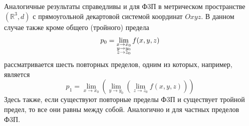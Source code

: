 Аналогичные результаты справедливы и для Ф3П в метрическом пространстве $ (\mathbb{R}^3, d) $ с прямоугольной декартовой системой координат $ Oxyz $. В данном случае также кроме общего (тройного) предела
\begin{equation*}
    p_0 = \lim\limits_{ \substack{ x \to x_0 \\ y \to y_0 \\ z \to z_0 } } f(x, y, z)
\end{equation*}
рассматривается шесть повторных пределов, одним из которых, например, является
\begin{equation*}
    p_1 = \lim\limits_{x \to x_0} \left( \lim\limits_{y \to y_0}
    \left( \lim\limits_{z \to z_0} f(x, y, z) \right) \right)
\end{equation*}
Здесь также, если существуют повторные пределы Ф3П и существует тройной предел, то все они равны между собой. Аналогично и для частных пределов Ф3П.
\newpage

